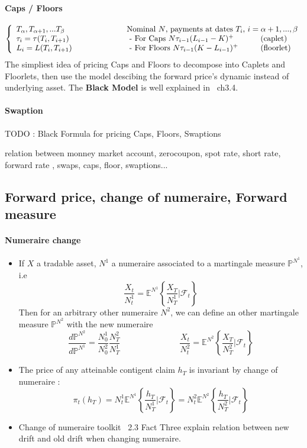 \documentclass[a4paper,10pt]{article}
\newcommand{\E}{\mathbb{E}}
\newcommand{\Proba}{\mathbb{P}}
\newcommand{\todo}[1]{\begin{center}\color{red} TODO : #1\end{center}}
\begin{document}
\paragraph{Caps / Floors}  
\[
\left\{
\begin{array}{l}
T_{\alpha},T_{\alpha+1},...T_{\beta} \\
\tau_i = \tau(T_i,T_{i+1})           \\
L_i    = L(T_i,T_{i+1})
\end{array}
\right.
\hspace{2cm}
\begin{array}{l}  
\text{Nominal $N$, payments at dates $T_i$,  } i=\alpha+1,...,\beta   \\
\text{ - For Caps    } N\tau_{i-1}(L_{i-1}-K)^+ \hspace{1.2 cm}\text{(caplet)}              \\
\text{ - For Floors  } N\tau_{i-1}(K-L_{i-1})^+ \hspace{1cm}\text{(floorlet)}
\end{array}
\]
The simpliest idea of pricing Caps and Floors to decompose into Caplets and Floorlets, then use the model descibing the forward price's dynamic instead of underlying asset. The \textbf{Black Model} is well explained in ~\cite{MAREK2009}ch3.4.


\paragraph{Swaption}
\todo{Black Formula for pricing Caps, Floors, Swaptions}  


relation between monney market account, zerocoupon, spot rate, short rate, forward rate , swaps, caps, floor, swaptions... 
\subsection{Forward price, change of numeraire, Forward measure}
\paragraph{Numeraire change}
\begin{itemize}[label={--}]
 \item If $X$ a tradable asset, $N^1$ a numeraire associated to a martingale measure $\Proba^{N^1}$, i.e 
 \[
 \frac{X_t}{N^1_t} = \E^{N^1}\left\{ \frac{X_T}{N^1_T}| \mathcal{F}_t \right\}
 \]
 Then for an arbitrary other numeraire $N^2$, we can define an other martingale measure $\Proba^{N^2}$ with the new numeraire
 \[
 \frac{d\Proba^{N^2}}{d\Proba^{N^1}}=\frac{N^1_0}{N^2_0}\frac{N^2_T}{N^1_T}
 \hspace{3cm}
 \frac{X_t}{N^2_t} = \E^{N^2}\left\{ \frac{X_T}{N^2_T}| \mathcal{F}_t \right\}
 \]
 \item The price of any atteinable contigent claim $h_T$ is invariant by change of numeraire :
 \[
 \pi_t(h_T) = N^1_t \E^{N^1}\left\{ \frac{h_T}{N^1_T}| \mathcal{F}_t \right\} = N^2_t\E^{N^2}\left\{ \frac{h_T}{N^2_T}| \mathcal{F}_t \right\}
 \]
 \item Change of numeraire toolkit ~\cite{BRIGO2006}2.3 Fact Three explain relation between new drift and old drift when changing numeraire.
\end{itemize}
\end{document}
